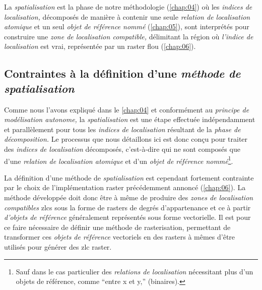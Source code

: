 La \emph{spatialisation} est la phase de notre méthodologie
(\autoref{chap:04}) où les \emph{indices de localisation,} décomposés
de manière à contenir une seule \emph{relation de localisation
  atomique} et un seul \emph{objet de référence nommé}
(\autoref{chap:05}), sont interprétés pour construire une \emph{zone
  de localisation compatible,} délimitant la région où \emph{l'indice
  de localisation} est vrai, représentée par un raster flou
(\autoref{chap:06}).

\subsection{Contraintes à la définition d'une \emph{méthode de spatialisation}}

Comme nous l'avons expliqué dans le \autoref{chap:04} et conformément
au \emph{principe de modélisation autonome,} la \emph{spatialisation}
est une étape effectuée indépendamment et parallèlement pour tous les
\emph{indices de localisation} résultant de la \emph{phase de
  décomposition.} Le processus que nous détaillons ici est donc conçu
pour traiter des \emph{indices de localisation} décomposés,
c'est-à-dire qui ne sont composés que d'une \emph{relation de
  localisation atomique} et d'un \emph{objet de référence
  nommé}\footnote{Sauf dans le cas particulier des \emph{relations de
    localisation} nécessitant plus d'un objets de référence, comme
  \enquote{entre x et y,} (\ie binaires).}.

La définition d'une méthode de \emph{spatialisation} est cependant
fortement contrainte par le choix de l'implémentation raster
précédemment annoncé (\autoref{chap:06}). La méthode développée doit
donc être à même de produire des \emph{zones de localisation
  compatibles} \acp{zlc} sous la forme de rasters de degrés
d'appartenance et ce à partir \emph{d'objets de référence}
généralement représentés sous forme vectorielle. Il est pour ce faire
nécessaire de définir une méthode de rasterisation, permettant de
transformer ces \emph{objets de référence} vectoriels en des rasters à
mêmes d'être utilisés pour générer des \ac{zlc} raster.

